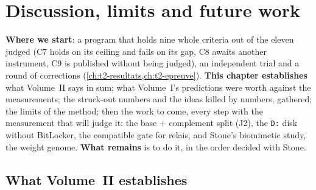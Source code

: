 \ifdefined\GrapheResVitesse\else\fi

\chapter{Discussion, limits and future work}\label{ch:t2-discussion}

\begin{origine}
\textbf{Where we start}: a program that holds nine whole criteria out of the eleven judged (C7 holds on its ceiling and fails on its gap, C8 awaits another instrument, C9 is published without being judged), an independent trial and a round of corrections (\cref{ch:t2-resultats,ch:t2-epreuve}).
\textbf{This chapter establishes} what Volume~II says in sum; what Volume~I's predictions were worth against the measurements; the struck-out numbers and the ideas killed by numbers, gathered; the limits of the method; then the work to come, every step with the measurement that will judge it: the base + complement split (J2), the \texttt{D:} disk without BitLocker, the compatible gate for relais, and Stone's biomimetic study, the weight genome.
\textbf{What remains} is to do it, in the order decided with Stone.
\end{origine}

\section{What Volume~II establishes}\label{t2d-sec:bilan}

